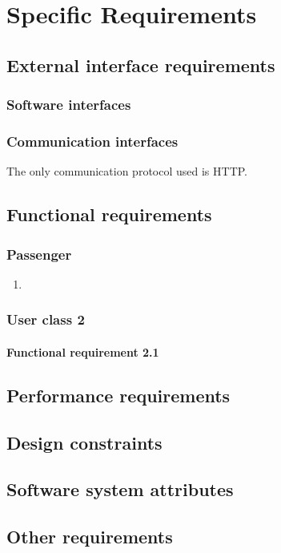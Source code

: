 \chapter{Specific Requirements}


\section{External interface requirements}

\subsection{Software interfaces}
\subsection{Communication interfaces}
The only communication protocol used is HTTP.

\section{Functional requirements}
\subsection{Passenger}
\begin{enumerate}
\item 
\end{enumerate}
\subsection{User class 2}
\subsubsection{Functional requirement 2.1}

\section{Performance requirements}
\section{Design constraints}
\section{Software system attributes}
\section{Other requirements}